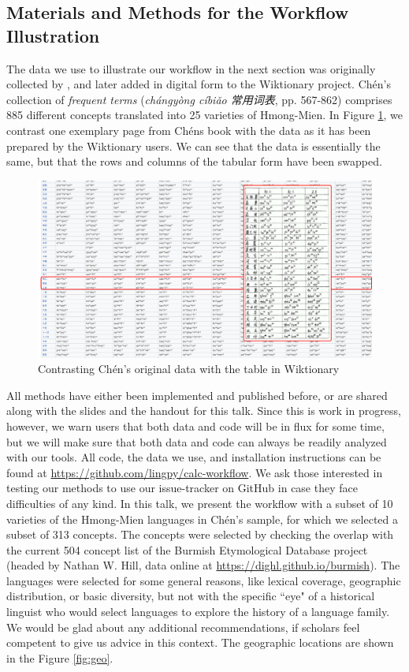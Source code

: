 \documentclass[xetex,svgnames]{scrartcl}
\begin{document}
\subsection{Materials and Methods for the Workflow Illustration}

The data we use to illustrate our workflow in the next section was originally collected by
\citet{Chen2012}, and later added in digital form to the Wiktionary project. Chén's collection of
\emph{frequent terms} (\emph{chángyòng cíbiǎo 常用词表}, pp. 567-862) comprises 885 different
concepts translated into 25 varieties of Hmong-Mien. In Figure \ref{fig:data}, we contrast one
exemplary page from Chéns book with the data as it has been prepared by the Wiktionary users.
We can see that the data is essentially the same, but that the rows and columns of the tabular form
have been swapped.

\begin{figure}[htb]
  \centering
  \includegraphics[width=\textwidth]{chen-illustration.pdf}
  \caption{Contrasting Chén's original data with the table in Wiktionary}
  \label{fig:data}
\end{figure}

All methods have either been implemented and published before, or are shared along with the slides
and the handout for this talk. Since this is work in progress, however, we warn users that both data
and code will be in flux for some time, but we will make sure that both data and code can always be
readily analyzed with our tools. All code, the data we use, and installation instructions can be
found at \url{https://github.com/lingpy/calc-workflow}. We ask those interested in testing our
methods to use our issue-tracker on GitHub in case they face difficulties of any kind.
In this talk, we present the workflow with a subset of 10 varieties of the Hmong-Mien languages in
Chén's sample, for which we selected a subset of 313 concepts. The concepts were selected by
checking the overlap with the current 504 concept list of the Burmish Etymological Database project
(headed by Nathan W. Hill, data online at \url{https://dighl.github.io/burmish}). 
The languages were selected for some general reasons, like lexical coverage, geographic
distribution, or basic diversity, but not with the specific ``eye" of a historical linguist who
would select languages to explore the history of a language family. We would be glad about any additional
recommendations, if scholars feel competent to give us advice in this context.
The
geographic locations are shown in the Figure \ref{fig:geo}.
\end{document}
